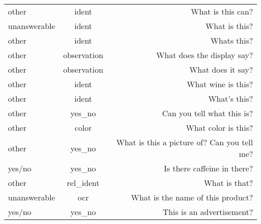 \begin{table}[!th]
{\begin{tabular}{lcr}
			other        & ident       & What is this can?                                                                                                  \\
			unanswerable & ident       & What is this?                                                                                                      \\
			other        & ident       & Whats this?                                                                                                        \\
			other        & observation & What does the display say?                                                                                         \\
			other        & observation & What does it say?                                                                                                  \\
			other        & ident       & What wine is this?                                                                                                 \\
			other        & ident       & What's this?                                                                                                       \\
			other        & yes\_no     & Can you tell what this is?                                                                                         \\
			other        & color       & What color is this?                                                                                                \\
			other        & yes\_no     & What is this a picture of?  Can you tell me?                                                                       \\
			yes/no       & yes\_no     & Is there caffeine in there?                                                                                        \\
			other        & rel\_ident  & What is that?                                                                                                      \\
			unanswerable & ocr         & What is the name of this product?                                                                                  \\
			yes/no       & yes\_no     & This is an advertisement?                                                                                          \\

\end{tabular}}
\end{table}
